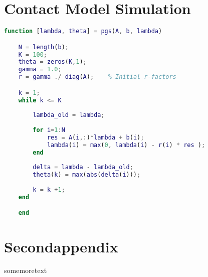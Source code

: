 \begin{appendices}
    \renewcommand{\thechapter}{\Alph{chapter}.}
    \chapter{Contact Model Simulation}
    \begin{lstlisting}[language=Matlab]
    function [lambda, theta] = pgs(A, b, lambda)

    N = length(b);
    K = 100;
    theta = zeros(K,1);
    gamma = 1.0;
    r = gamma ./ diag(A);    % Initial r-factors

    k = 1;
    while k <= K
    
        lambda_old = lambda;
        
        for i=1:N         
            res = A(i,:)*lambda + b(i);
            lambda(i) = max(0, lambda(i) - r(i) * res );
        end
    
        delta = lambda - lambda_old;
        theta(k) = max(abs(delta(i)));
    
        k = k +1; 
    end

    end

    \end{lstlisting}
    \chapter{Secondappendix}
    somemoretext
\end{appendices}